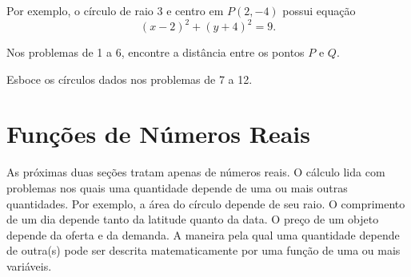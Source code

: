 \documentclass{svmono}
\begin{document}
Por exemplo, o círculo de raio $3$ e centro em $P(2,-4)$ possui equação
\[
	(x-2)^2 + (y+4)^2 = 9.
\]

\sectionproblems

\noindent Nos problemas de 1 a 6, encontre a distância entre
          os pontos $P$ e $Q$.

\begin{multicols}{2}
\end{multicols}

\noindent Esboce os círculos dados nos problemas de 7 a 12.

\begin{multicols}{2}
\end{multicols}






\section{Funções de Números Reais}
\label{sec:funcreal}

As próximas duas seções tratam apenas de números reais. O cálculo
lida com problemas nos quais uma quantidade depende de uma ou mais
outras quantidades. Por exemplo, a área do círculo depende de seu
raio. O comprimento de um dia depende tanto da latitude quanto da
data. O preço de um objeto depende da oferta e da demanda. A maneira
pela qual uma quantidade depende de outra(s) pode ser descrita
matematicamente por uma função de uma ou mais variáveis.
\end{document}
